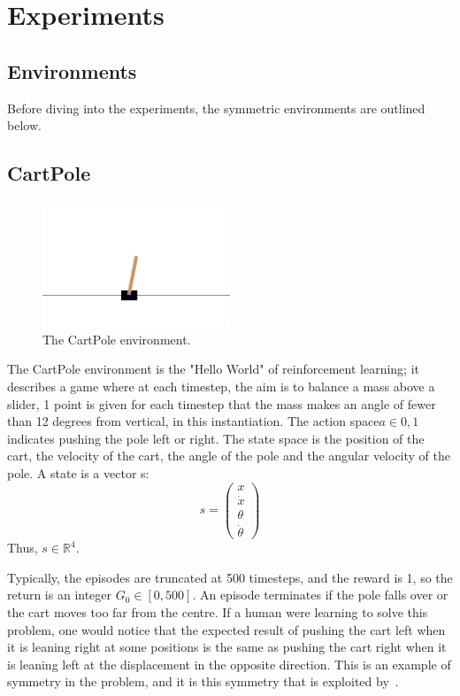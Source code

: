 \chapter{Experiments}
\section{Environments}
Before diving into the experiments, the symmetric environments are outlined below.
\section{CartPole}\label{sec:cartpole}
\begin{figure}[h!]
	\centering
	\includegraphics[width=0.5\textwidth]{Figures/cart_pole.png}
	\caption{The CartPole environment.}
\end{figure}
The CartPole environment is the "Hello World" of reinforcement learning; it describes a game where at each timestep, the aim is to balance a mass above a slider, 1 point is given for each timestep that the mass makes an angle of fewer than 12 degrees from vertical, in this instantiation. The action space$a \in {0,1}$ indicates pushing the pole left or right. The state space is the position of the cart, the velocity of the cart, the angle of the pole and the angular velocity of the pole. A state is a vector s:
\begin{equation}
	s = \begin{pmatrix}
		x       \\
		\dot{x} \\
		\theta  \\
		\dot{\theta}
	\end{pmatrix}
\end{equation}
Thus, $s \in \mathbb{R}^4$.

Typically, the episodes are truncated at 500 timesteps, and the reward is 1, so the return is an integer $G_0 \in [0, 500]$. An episode terminates if the pole falls over or the cart moves too far from the centre. If a human were learning to solve this problem, one would notice that the expected result of pushing the cart left when it is leaning right at some positions is the same as pushing the cart right when it is leaning left at the displacement in the opposite direction. This is an example of symmetry in the problem, and it is this symmetry that is exploited by~\cite{vanderpol2020mdp, mondal2020group}.

